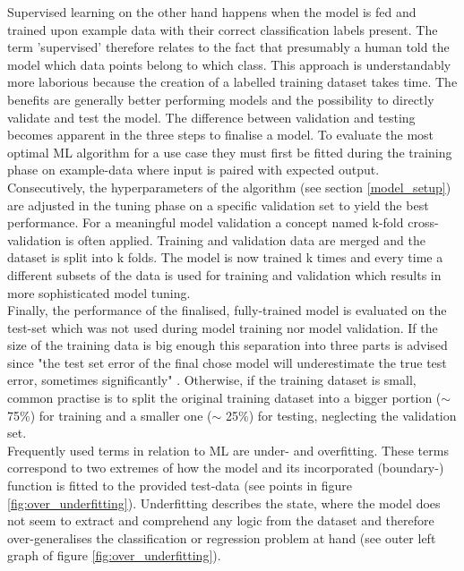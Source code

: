 Supervised learning on the other hand happens when the model is fed and trained upon example data with their correct classification labels present. The term 'supervised' therefore relates to the fact that presumably a human told the model which data points belong to which class. This approach is understandably more laborious because the creation of a labelled training dataset takes time. The benefits are generally better performing models and the possibility to directly validate and test the model. The difference between validation and testing becomes apparent in the three steps to finalise a model. To evaluate the most optimal ML algorithm for a use case they must first be fitted during the training phase on example-data where input is paired with expected output. Consecutively, the hyperparameters of the algorithm (see section \ref{model_setup}) are adjusted in the tuning phase on a specific validation set to yield the best performance. For a meaningful model validation a concept named k-fold cross-validation is often applied. Training and validation data are merged and the dataset is split into k folds. The model is now trained k times and every time a different subsets of the data is used for training and validation which results in more sophisticated model tuning. \\
Finally, the performance of the finalised, fully-trained model is evaluated on the test-set which was not used during model training nor model validation. If the size of the training data is big enough this separation into three parts is advised since "the test set error of the final chose model will underestimate the true test error, sometimes significantly" \parencite[p.222]{Hastie2017}. Otherwise, if the training dataset is small, common practise \parencite{Guido2016} is to split the original training dataset into a bigger portion ($\sim$ 75\%) for training and a smaller one ($\sim$ 25\%) for testing, neglecting the validation set. \\
\newline
Frequently used terms in relation to ML are under- and overfitting. These terms correspond to two extremes of how the model and its incorporated (boundary-) function is fitted to the provided test-data (see points in figure \ref{fig:over_underfitting}). Underfitting describes the state, where the model does not seem to extract and comprehend any logic from the dataset and therefore over-generalises the classification or regression problem at hand (see outer left graph of figure \ref{fig:over_underfitting}). \\
